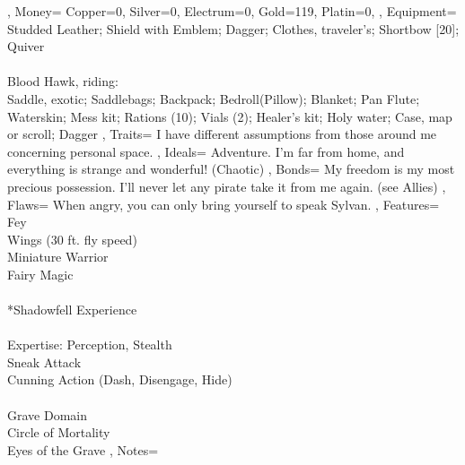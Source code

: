 \documentclass[10pt,a4paper]{scrbook}
\begin{document}
{{{			}
		},
		Money={
			Copper=0,
			Silver=0,
			Electrum=0,
			Gold=119,
			Platin=0,
		},
		Equipment={%
			Studded Leather; %
			Shield with Emblem; %
			Dagger; %
			Clothes, traveler's;%
			Shortbow [20]; %
			Quiver\\%
			\\
			Blood Hawk, riding:\\
			Saddle, exotic;
			Saddlebags;
			Backpack;
			Bedroll(Pillow);
			Blanket;
			Pan Flute;
			Waterskin;
			Mess kit;
			Rations (10);
			Vials (2);
			Healer's kit;
			Holy water;
			Case, map or scroll;
			Dagger
		},
		Traits={
			I have different assumptions from those around me concerning personal space.
		},
		Ideals={
			Adventure. I'm far from home, and everything is strange and wonderful! (Chaotic)
		},
		Bonds={
			My freedom is my most precious possession. I’ll never let any pirate take it from me again. (see Allies)
		},
		Flaws={
			When angry, you can only bring yourself to speak Sylvan.
		},
		Features={
			Fey\\
			Wings (30 ft. fly speed) \\
			Miniature Warrior\\
			Fairy Magic\\
			\\
			*Shadowfell Experience\\
			\\
			Expertise: Perception, Stealth\\
			Sneak Attack\\
			Cunning Action (Dash, Disengage, Hide)\\
			\\
			Grave Domain\\
			Circle of Mortality\\
			Eyes of the Grave
		},
		Notes={
			
		}
	}
\end{document}
